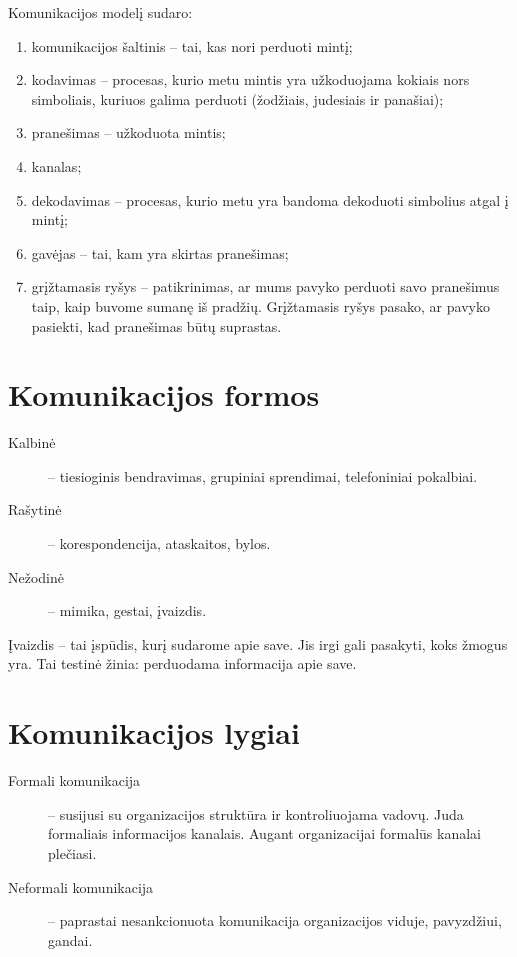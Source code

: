Komunikacijos modelį sudaro:
\begin{enumerate}
  \item komunikacijos šaltinis – tai, kas nori perduoti mintį;
  \item kodavimas – procesas, kurio metu mintis yra užkoduojama
    kokiais nors simboliais, kuriuos galima perduoti (žodžiais,
    judesiais ir panašiai);
  \item pranešimas – užkoduota mintis;
  \item kanalas;
  \item dekodavimas – procesas, kurio metu yra bandoma dekoduoti
    simbolius atgal į mintį;
  \item gavėjas – tai, kam yra skirtas pranešimas;
  \item grįžtamasis ryšys – patikrinimas, ar mums pavyko perduoti
    savo pranešimus taip, kaip buvome sumanę iš pradžių. Grįžtamasis
    ryšys pasako, ar pavyko pasiekti, kad pranešimas būtų suprastas.
\end{enumerate}

\section{Komunikacijos formos}

\begin{description}
  \item[Kalbinė] – tiesioginis bendravimas, grupiniai sprendimai,
    telefoniniai pokalbiai.
  \item[Rašytinė] – korespondencija, ataskaitos, bylos.
  \item[Nežodinė] – mimika, gestai, įvaizdis.
\end{description}

Įvaizdis – tai įspūdis, kurį sudarome apie save. Jis irgi gali pasakyti,
koks žmogus yra. Tai testinė žinia: perduodama informacija apie save. %

\section{Komunikacijos lygiai}

\begin{description}
  \item[Formali komunikacija] – susijusi su organizacijos struktūra ir
    kontroliuojama vadovų. Juda formaliais informacijos kanalais.
    Augant organizacijai formalūs kanalai plečiasi.
  \item[Neformali komunikacija] – paprastai nesankcionuota komunikacija
    organizacijos viduje, pavyzdžiui, gandai.
\end{description}

